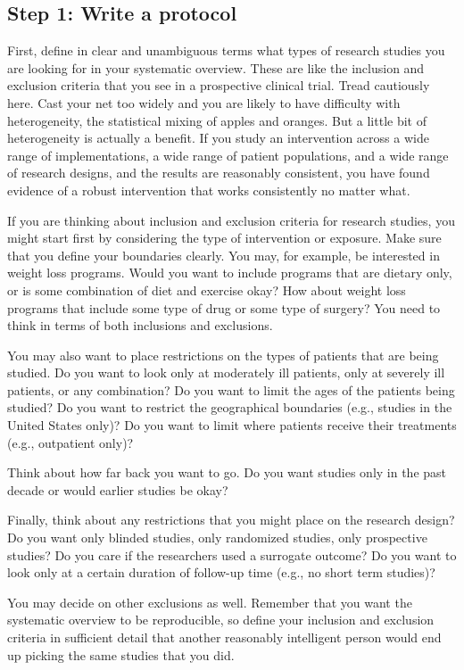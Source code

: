 \documentclass[
  letterpaper,
  DIV=11,
  numbers=noendperiod]{scrreprt}
\begin{document}
\begin{tcolorbox}
\section{Step 1: Write a protocol}\label{step-1-write-a-protocol}

First, define in clear and unambiguous terms what types of research
studies you are looking for in your systematic overview. These are like
the inclusion and exclusion criteria that you see in a prospective
clinical trial. Tread cautiously here. Cast your net too widely and you
are likely to have difficulty with heterogeneity, the statistical mixing
of apples and oranges. But a little bit of heterogeneity is actually a
benefit. If you study an intervention across a wide range of
implementations, a wide range of patient populations, and a wide range
of research designs, and the results are reasonably consistent, you have
found evidence of a robust intervention that works consistently no
matter what.

If you are thinking about inclusion and exclusion criteria for research
studies, you might start first by considering the type of intervention
or exposure. Make sure that you define your boundaries clearly. You may,
for example, be interested in weight loss programs. Would you want to
include programs that are dietary only, or is some combination of diet
and exercise okay? How about weight loss programs that include some type
of drug or some type of surgery? You need to think in terms of both
inclusions and exclusions.

You may also want to place restrictions on the types of patients that
are being studied. Do you want to look only at moderately ill patients,
only at severely ill patients, or any combination? Do you want to limit
the ages of the patients being studied? Do you want to restrict the
geographical boundaries (e.g., studies in the United States only)? Do
you want to limit where patients receive their treatments (e.g.,
outpatient only)?

Think about how far back you want to go. Do you want studies only in the
past decade or would earlier studies be okay?

Finally, think about any restrictions that you might place on the
research design? Do you want only blinded studies, only randomized
studies, only prospective studies? Do you care if the researchers used a
surrogate outcome? Do you want to look only at a certain duration of
follow-up time (e.g., no short term studies)?

You may decide on other exclusions as well. Remember that you want the
systematic overview to be reproducible, so define your inclusion and
exclusion criteria in sufficient detail that another reasonably
intelligent person would end up picking the same studies that you did.


\end{tcolorbox}
\end{document}
